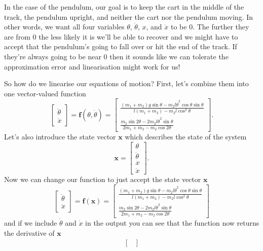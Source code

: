 \documentclass{article}
\renewcommand{\vec}[1]{\boldsymbol{\mathbf{#1}}}
\begin{document}
In the case of the pendulum, our goal is to keep the cart in the middle of the track, the pendulum upright, and neither the cart nor the pendulum moving. In other words, we want all four variables $\theta$, $\dot{\theta}$, $x$, and $\dot{x}$ to be $0$. The further they are from $0$ the less likely it is we'll be able to recover and we might have to accept that the pendulum's going to fall over or hit the end of the track. If they're always going to be near $0$ then it sounds like we can tolerate the approximation error and linearisation might work for us!

So how do we linearise our equations of motion? First, let's combine them into one vector-valued function \[\begin{bmatrix}
    \ddot{\theta} \\
    \ddot{x}
  \end{bmatrix} = \vec{f}(\theta, \dot{\theta}) = \begin{bmatrix}
    \frac{(m_1 + m_2) g \sin \theta - m_2 l \dot{\theta}^2 \cos \theta \sin \theta}{l (m_1 + m_2) - m_2 l \cos^2 \theta} \\
    \frac{m_2 \sin 2 \theta - 2 m_2 l \dot{\theta}^2 \sin \theta}{2 m_1 + m_2 - m_2 \cos 2 \theta}
\end{bmatrix}.\] Let's also introduce the state vector $\vec{x}$ which describes the state of the system \[\vec{x} = \begin{bmatrix}
    \theta       \\
    \dot{\theta} \\
    x            \\
    \dot{x}
\end{bmatrix}.\] Now we can change our function to just accept the state vector $\vec{x}$ \[\begin{bmatrix}
    \ddot{\theta} \\
    \ddot{x}
  \end{bmatrix} = \vec{f}(\vec{x}) = \begin{bmatrix}
    \frac{(m_1 + m_2) g \sin \theta - m_2 l \dot{\theta}^2 \cos \theta \sin \theta}{l (m_1 + m_2) - m_2 l \cos^2 \theta} \\
    \frac{m_2 \sin 2 \theta - 2 m_2 l \dot{\theta}^2 \sin \theta}{2 m_1 + m_2 - m_2 \cos 2 \theta}
\end{bmatrix}\] and if we include $\dot{\theta}$ and $\dot{x}$ in the output you can see that the function now returns the derivative of $\vec{x}$ \begin{align*}
  \begin{bmatrix}

\end{bmatrix}
\end{align*}
\end{document}
